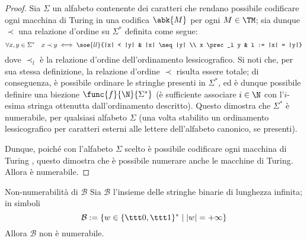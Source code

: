 \documentclass[a4paper, 12pt]{report}
\begin{document}
    \begin{proof}
        Sia $\Sigma$ un alfabeto contenente dei caratteri che rendano possibile codificare ogni macchina di Turing in una codifica $\abk{M}$ per ogni $M \in \TM$; sia dunque $\prec$ una relazione d'ordine su $\Sigma^*$ definita come segue: $$\forall x, y \in \Sigma^* \quad x \prec y \iff \soe{ll}{|x| < |y| & |x| \neq |y| \\ x \prec_l y & l := |x| = |y|}$$ dove $\prec_l$ è la relazione d'ordine dell'ordinamento lessicografico. Si noti che, per sua stessa definizione, la relazione d'ordine $\prec$ risulta essere totale; di conseguenza, è possibile ordinare  le stringhe presenti in $\Sigma^*$, ed è dunque possibile definire una biezione $\func{f}{\N}{\Sigma^*}$ (è sufficiente associare $i \in \N$ con l'$i$-esima stringa ottenutta dall'ordinamento descritto). Questo dimostra che $\Sigma^*$ è numerabile, per qualsiasi alfabeto $\Sigma$ (una volta stabilito un ordinamento lessicografico per caratteri esterni alle lettere dell'alfabeto canonico, se presenti).

        Dunque, poiché con l'alfabeto $\Sigma$ scelto è possibile codificare ogni macchina di Turing \TM, questo dimostra che è possibile numerare anche le macchine di Turing. Allora \TM è numerabile.
    \end{proof}

    \begin{framedprop}[label={not num B}]{Non-numerabilità di $\mathcal B$}
        Sia $\mathcal B$ l'insieme delle stringhe binarie di lunghezza infinita; in simboli $$\mathcal B := \{w \in \{\ttt 0, \ttt 1\}^* \mid |w| = + \infty\}$$ Allora $\mathcal B$ non è numerabile.
    \end{framedprop}
\end{document}
